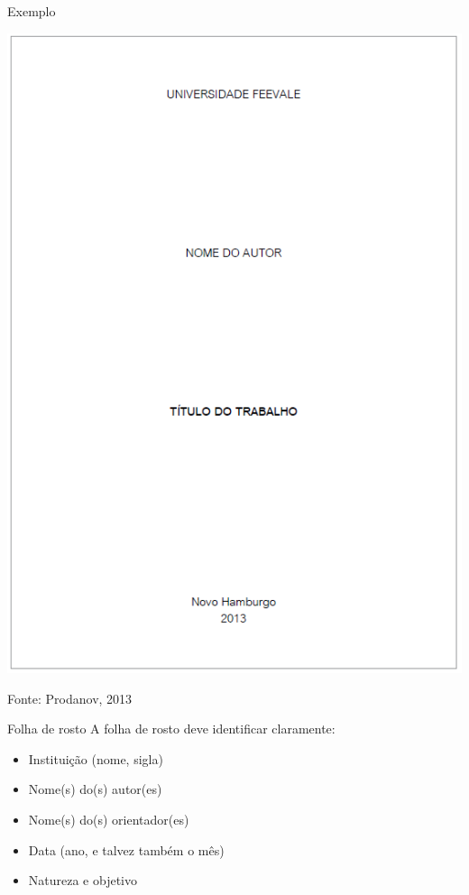 \documentclass{beamer}
\begin{document}
\begin{frame}{Exemplo}
  \begin{center}
    \includegraphics[height=0.8\textheight]{ProjetoII/capa}
  \end{center}

  \vfill
  Fonte: Prodanov, 2013
\end{frame}

\begin{frame}{Folha de rosto}
A folha de rosto deve identificar claramente:
  \begin{itemize}
  \item Instituição (nome, sigla)
  \item Nome(s) do(s) autor(es)
  \item Nome(s) do(s) orientador(es)
  \item Data (ano, e talvez também o mês)
  \item Natureza e objetivo
  \end{itemize}
\end{frame}
\end{document}
